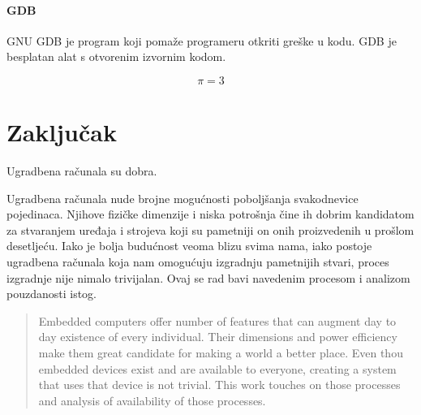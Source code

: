 \documentclass[times, utf8, diplomski]{diplomski}
\begin{document}
\subsubsection{GDB}
GNU GDB\cite{gdb} je program koji pomaže programeru otkriti greške u kodu. GDB je besplatan alat s otvorenim izvornim kodom.

\begin{equation}
  \pi=3
\end{equation}

\chapter{Zaključak}
Ugradbena računala su dobra.

\nocite{*}



\listoffigures

\lstlistoflistings


\begin{sazetak}
Ugradbena računala nude brojne mogućnosti poboljšanja svakodnevice pojedinaca. Njihove fizičke dimenzije i niska potrošnja čine ih dobrim kandidatom za stvaranjem uređaja i strojeva koji su pametniji on onih proizvedenih u prošlom desetljeću. Iako je bolja budućnost veoma blizu svima nama, iako postoje ugradbena računala koja nam omogućuju izgradnju pametnijih stvari, proces izgradnje nije nimalo trivijalan. Ovaj se rad bavi navedenim procesom i analizom pouzdanosti istog.

\end{sazetak}


\begin{abstract}
Embedded computers offer number of features that can augment day to day existence of every individual. Their dimensions and power efficiency make them great candidate for making a world a better place. Even thou embedded devices exist and are available to everyone, creating a system that uses that device is not trivial. This work touches on those processes and analysis of availability of those processes.

\end{abstract}
\end{document}
